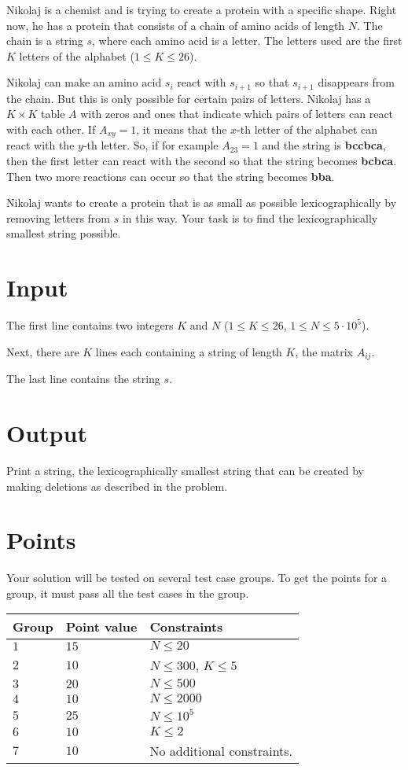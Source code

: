 \noindent
Nikolaj is a chemist and is trying to create a protein with a specific shape. Right now, he has a protein that consists of a chain of amino acids of length $N$. The chain is a string $s$, where each amino acid is a letter. The letters used are the first $K$ letters of the alphabet ($1 \leq K \leq 26$).

Nikolaj can make an amino acid $s_i$ react with $s_{i+1}$ so that $s_{i+1}$ disappears from the chain. But this is only possible for certain pairs of letters. Nikolaj has a $K \times K$ table $A$ with zeros and ones that indicate which pairs of letters can react with each other. If $A_{xy} = 1$, it means that the $x$-th letter of the alphabet can react with the $y$-th letter. So, if for example $A_{23} = 1$ and the string is \textbf{bccbca}, then the first letter can react with the second so that the string becomes \textbf{bcbca}. Then two more reactions can occur so that the string becomes \textbf{bba}.

Nikolaj wants to create a protein that is as small as possible lexicographically by removing letters from $s$ in this way. Your task is to find the lexicographically smallest string possible.

\section*{Input}
The first line contains two integers $K$ and $N$ ($1 \leq K \leq 26$, $1 \leq N \leq 5 \cdot 10^5$).

Next, there are $K$ lines each containing a string of length $K$, the matrix $A_{ij}$.

The last line contains the string $s$.

\section*{Output}
Print a string, the lexicographically smallest string that can be created by making deletions as described in the problem.

\section*{Points}
Your solution will be tested on several test case groups.
To get the points for a group, it must pass all the test cases in the group.

\noindent
\begin{tabular}{| l | l | l |}
  \hline
  \textbf{Group} & \textbf{Point value} & \textbf{Constraints} \\ \hline
  $1$   & $15$       & $N \leq 20$\\ \hline
  $2$   & $10$       & $N \leq 300$, $K \leq 5$  \\ \hline
  $3$   & $20$       & $N \leq 500$ \\ \hline
  $4$   & $10$       & $N \leq 2000$ \\ \hline
  $5$   & $25$       & $N \leq 10^5$ \\ \hline
  $6$   & $10$       & $K \leq 2$ \\ \hline
  $7$   & $10$       & No additional constraints. \\ \hline
\end{tabular}
